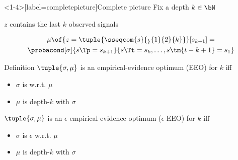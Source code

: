 \begin{frame}<1-4>[label=completepicture]{Complete picture}
  Fix a depth \(k \in \bN\)

  \bigskip


  \medskip

  \(z\) contains the last \(k\) observed signals

  \vskip-0.5cm
  \begin{multline*}
    \mu\of{z = \tuple{\sseqcom{s}{_}{1}{2}{k}}}[s_{k+1}] = \\
    \probacond[\sigma]{s\Tp = s_{k+1}}{s\Tt=s_{k}, \dots, s \tm{t -k + 1} = s_{1}}
  \end{multline*}
\end{frame}
\begin{frame}{Definition}
  \(\tuple{\sigma, \mu}\) is an empirical-evidence optimum (EEO) for \(k\) iff
  \begin{itemize}
    \item \(\sigma\) is  w.r.t. \(\mu\)
    \item \(\mu\) is depth-\(k\)  with \(\sigma\)
  \end{itemize}

  \bigskip

  \(\tuple{\sigma, \mu}\) is an \alert{\(\epsilon\)} empirical-evidence optimum (\alert{\(\epsilon\)} EEO) for \(k\) iff
  \begin{itemize}
    \item \(\sigma\) is \alert{\(\epsilon\)}  w.r.t. \(\mu\)
    \item \(\mu\) is depth-\(k\)  with \(\sigma\)
  \end{itemize}
\end{frame}
